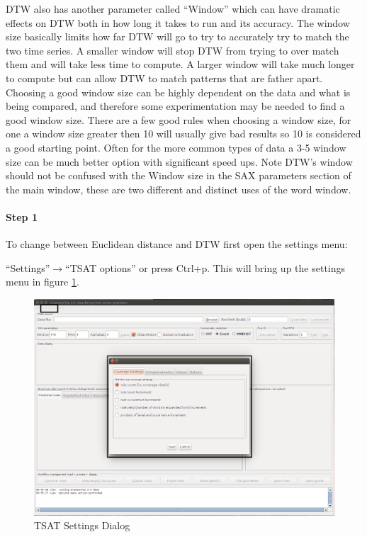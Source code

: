 \documentclass[letterpaper, 12pt]{article}
\begin{document}
DTW also has another parameter called ``Window'' which can have dramatic effects on DTW both in how long it takes to run and its accuracy. The window size basically limits how far DTW will go to try to accurately try to match the two time series. A smaller window will stop DTW from trying to over match them and will take less time to compute. A larger window will take much longer to compute but can allow DTW to match patterns that are father apart. Choosing a good window size can be highly dependent on the data and what is being compared, and therefore some experimentation may be needed to find a good window size. There are a few good rules when choosing a window size, for one a window size greater then 10 will usually give bad results so 10 is considered a good starting point. Often for the more common types of data a 3-5 window size can be much better option with significant speed ups. Note DTW's window should not be confused with the Window size in the SAX parameters section of the main window, these are two different and distinct uses of the word window. 

\newpage
\paragraph{Step 1}
To change between Euclidean distance and DTW first open the settings menu:

``Settings''$\rightarrow$``TSAT options'' or press Ctrl+p. This will bring up the settings menu in figure \ref{fig:TSAT-settings-dialog}.

\begin{figure}[H]
  \includegraphics[width=\textwidth]{TSAT-settings-dialog}
  \caption{TSAT Settings Dialog}
  \label{fig:TSAT-settings-dialog}
\end{figure}
\end{document}
